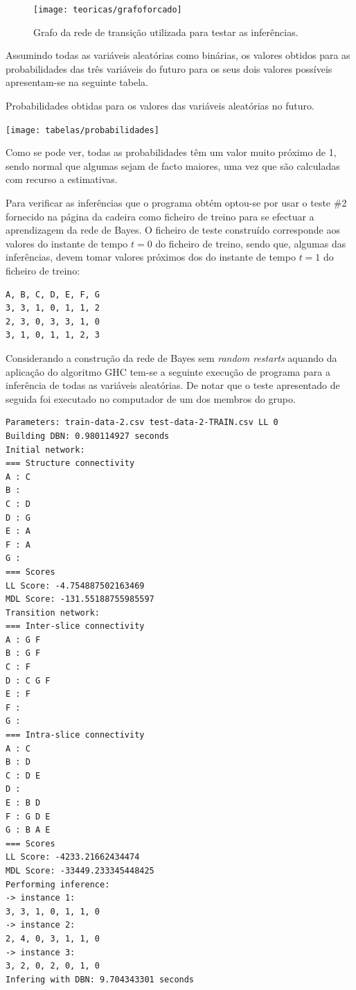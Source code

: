 \documentclass[10pt]{article}
\numberwithin{equation}{section}
\begin{document}
\begin{figure}[H]
	\centering
	\texttt{[image: teoricas/grafoforcado]}
	\caption{Grafo da rede de transição utilizada para testar as inferências.}
	\vspace{-0.8em}
	\label{fig:grafoforcado}
\end{figure}

Assumindo todas as variáveis aleatórias como binárias, os valores obtidos para as probabilidades das três variáveis do futuro para os seus dois valores possíveis apresentam-se na seguinte tabela.

\begin{table}[H]
	\centering
	\caption{Probabilidades obtidas para os valores das variáveis aleatórias no futuro.}
	\vspace{-1.5mm}
	\texttt{[image: tabelas/probabilidades]}
\end{table}

\vspace{-1.5mm}
Como se pode ver, todas as probabilidades têm um valor muito próximo de 1, sendo normal que algumas sejam de facto maiores, uma vez que são calculadas com recurso a estimativas.

Para verificar as inferências que o programa obtém optou-se por usar o teste \#2 fornecido na página da cadeira como ficheiro de treino para se efectuar a aprendizagem da rede de Bayes. O ficheiro de teste construído corresponde aos valores do instante de tempo $t = 0$ do ficheiro de treino, sendo que, algumas das inferências, devem tomar valores próximos dos do instante de tempo $t = 1$ do ficheiro de treino:

\begin{lstlisting}
A, B, C, D, E, F, G
3, 3, 1, 0, 1, 1, 2
2, 3, 0, 3, 3, 1, 0
3, 1, 0, 1, 1, 2, 3
\end{lstlisting}

Considerando a construção da rede de Bayes sem \textit{random restarts} aquando da aplicação do algoritmo GHC tem-se a seguinte execução de programa para a inferência de todas as variáveis aleatórias. De notar que o teste apresentado de seguida foi executado no computador de um dos membros do grupo.

\begin{lstlisting}
Parameters: train-data-2.csv test-data-2-TRAIN.csv LL 0
Building DBN: 0.980114927 seconds
Initial network: 
=== Structure connectivity
A : C 
B : 
C : D 
D : G 
E : A 
F : A 
G : 
=== Scores
LL Score: -4.754887502163469
MDL Score: -131.55188755985597
Transition network: 
=== Inter-slice connectivity
A : G F 
B : G F 
C : F 
D : C G F 
E : F 
F : 
G : 
=== Intra-slice connectivity
A : C 
B : D 
C : D E 
D : 
E : B D 
F : G D E 
G : B A E 
=== Scores
LL Score: -4233.21662434474
MDL Score: -33449.233345448425
Performing inference:
-> instance 1: 
3, 3, 1, 0, 1, 1, 0
-> instance 2: 
2, 4, 0, 3, 1, 1, 0
-> instance 3: 
3, 2, 0, 2, 0, 1, 0
Infering with DBN: 9.704343301 seconds
\end{lstlisting}
\end{document}
